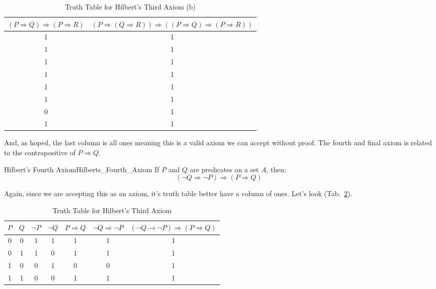    \begin{table}[H]
        \centering
        \captionsetup{type=table}
        \begin{tabular}{c|c}
            $(P\Rightarrow{Q})\Rightarrow(P\Rightarrow{R})$&
            $(P\Rightarrow(Q\Rightarrow{R}))\Rightarrow%
             ((P\Rightarrow{Q})\Rightarrow(P\Rightarrow{R}))$\\
            \hline
            1&1\\
            1&1\\
            1&1\\
            1&1\\
            1&1\\
            1&1\\
            0&1\\
            1&1
        \end{tabular}
        \caption{Truth Table for Hilbert's Third Axiom (b)}
        \label{tab:Truth_Table_for_Hilberts_Third_b}
    \end{table}
    And, as hoped, the last column is all ones meaning this is a valid axiom
    we can accept without proof. The fourth and final axiom is related to the
    contrapositive of $P\Rightarrow{Q}$.
    \begin{faxiom}{Hilbert's Fourth Axiom}{Hilberts_Fourth_Axiom}
        If $P$ and $Q$ are \glspl{predicate} on a \gls{set} $A$, then:%
        \begin{equation*}
            (\neg{Q}\Rightarrow\neg{P})\Rightarrow(P\Rightarrow{Q})
        \end{equation*}
    \end{faxiom}
    Again, since we are accepting this as an axiom, it's truth table better have
    a column of ones. Let's look
    (Tab.~\ref{tab:Truth_Table_Hiberts_Third_Axiom}).
    \begin{table}[H]
        \centering
        \captionsetup{type=table}
        \begin{tabular}{c|c|c|c|c|c|c}
            $P$&$Q$&$\neg{P}$&$\neg{Q}$&$P\Rightarrow{Q}$&
                $\neg{Q}\Rightarrow\neg{P}$&
                $(\neg{Q}\rightarrow\neg{P})\Rightarrow(P\Rightarrow{Q})$\\
            \hline
            0&0&1&1&1&1&1\\
            0&1&1&0&1&1&1\\
            1&0&0&1&0&0&1\\
            1&1&0&0&1&1&1
        \end{tabular}
        \caption{Truth Table for Hilbert's Third Axiom}
        \label{tab:Truth_Table_Hiberts_Third_Axiom}
    \end{table}
